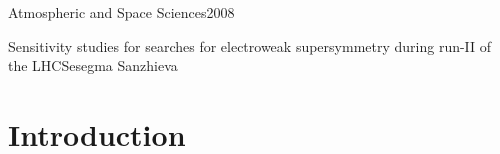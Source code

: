 \documentclass[reqno,12pt,oneside]{report} %
\theoremstyle{plain}
\theoremstyle{definition}
\theoremstyle{remark}
\numberwithin{theorem}{chapter}     %
\begin{document}

{Atmospheric and Space Sciences}{2008}
{}

\initializefrontsections



\makeatletter
\if@twoside \setcounter{page}{4} \else \setcounter{page}{1} \fi
\makeatother
 

%

%

\tableofcontents     %

\startabstractpage
{Sensitivity studies for searches for electroweak supersymmetry during run-II of the LHC}{Sesegma Sanzhieva}{}

\label{Abstract}

\startthechapters

 \chapter{Introduction}
 \label{chap:Intro}
 
\end{document}
